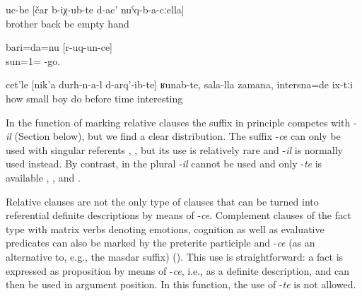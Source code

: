 \begin{exe}
		\ex	\label{ex:the brothers who came home with empty hands}
		\gll	uc-be	[čar	b-iχ-ub-te	d-ac'	nuˁq-b-a-cːella]\\
			brother	back	be empty	hand\\
		\glt	{}

\ex	\label{I am the sun that shines (lit. goes).}
	\gll bari=da=nu	[r-uq-un-ce]\\
	sun=1=		-go.\\
	\glt	{}

	\ex	\label{ex:How the ones like made by little children, from the old times, they were interesting minor@16c}
	\gll	cet'le	[nik'a	durħ-n-a-l	d-arq'-ib-te]	ʁunab-te,	sala-lla	zamana, 	intersna=de	ix-tːi\\
		how	small	boy	do 		before	time	interesting	\\
	\glt	{}
\end{exe}

In the function of marking relative clauses the suffix in principle competes with -\textit{il} (Section  below), but we find a clear distribution. The suffix -\textit{ce} can only be used with singular referents , , but its use is relatively rare and -\textit{il} is normally used instead. By contrast, in the plural -\textit{il} cannot be used and only -\textit{te} is available , , and .

Relative clauses are not the only type of clauses that can be turned into referential definite descriptions by means of -\textit{ce}. Complement clauses of the fact type with matrix verbs denoting emotions, cognition as well as evaluative predicates can also be marked by the preterite participle and -\textit{ce} (as an alternative to, e.g., the masdar suffix) (). This use is straightforward: a fact is expressed as proposition by means of -\textit{ce}, i.e., as a definite description, and can then be used in argument position. In this function, the use of -\textit{te} is not allowed.

